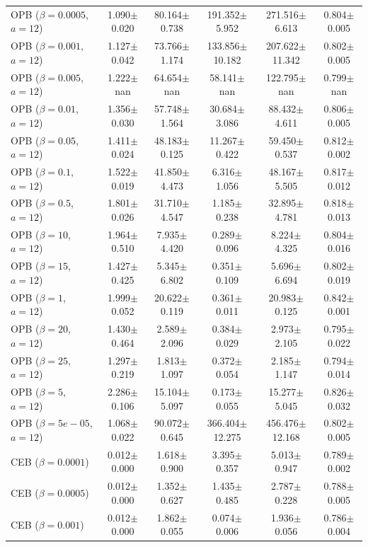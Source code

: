 \begin{table}[t]
{\begin{tabular}{l c c c c c}
OPB ($\beta=0.0005$, $a=12$) & 1.090$\pm$0.020 & 80.164$\pm$0.738 & 191.352$\pm$5.952 & 271.516$\pm$6.613 & 0.804$\pm$0.005 \\
OPB ($\beta=0.001$, $a=12$) & 1.127$\pm$0.042 & 73.766$\pm$1.174 & 133.856$\pm$10.182 & 207.622$\pm$11.342 & 0.802$\pm$0.005 \\
OPB ($\beta=0.005$, $a=12$) & 1.222$\pm$nan & 64.654$\pm$nan & 58.141$\pm$nan & 122.795$\pm$nan & 0.799$\pm$nan \\
OPB ($\beta=0.01$, $a=12$) & 1.356$\pm$0.030 & 57.748$\pm$1.564 & 30.684$\pm$3.086 & 88.432$\pm$4.611 & 0.806$\pm$0.005 \\
OPB ($\beta=0.05$, $a=12$) & 1.411$\pm$0.024 & 48.183$\pm$0.125 & 11.267$\pm$0.422 & 59.450$\pm$0.537 & 0.812$\pm$0.002 \\
OPB ($\beta=0.1$, $a=12$) & 1.522$\pm$0.019 & 41.850$\pm$4.473 & 6.316$\pm$1.056 & 48.167$\pm$5.505 & 0.817$\pm$0.012 \\
OPB ($\beta=0.5$, $a=12$) & 1.801$\pm$0.026 & 31.710$\pm$4.547 & 1.185$\pm$0.238 & 32.895$\pm$4.781 & 0.818$\pm$0.013 \\
OPB ($\beta=10$, $a=12$) & 1.964$\pm$0.510 & 7.935$\pm$4.420 & 0.289$\pm$0.096 & 8.224$\pm$4.325 & 0.804$\pm$0.016 \\
OPB ($\beta=15$, $a=12$) & 1.427$\pm$0.425 & 5.345$\pm$6.802 & 0.351$\pm$0.109 & 5.696$\pm$6.694 & 0.802$\pm$0.019 \\
OPB ($\beta=1$, $a=12$) & 1.999$\pm$0.052 & 20.622$\pm$0.119 & 0.361$\pm$0.011 & 20.983$\pm$0.125 & 0.842$\pm$0.001 \\
OPB ($\beta=20$, $a=12$) & 1.430$\pm$0.464 & 2.589$\pm$2.096 & 0.384$\pm$0.029 & 2.973$\pm$2.105 & 0.795$\pm$0.022 \\
OPB ($\beta=25$, $a=12$) & 1.297$\pm$0.219 & 1.813$\pm$1.097 & 0.372$\pm$0.054 & 2.185$\pm$1.147 & 0.794$\pm$0.014 \\
OPB ($\beta=5$, $a=12$) & 2.286$\pm$0.106 & 15.104$\pm$5.097 & 0.173$\pm$0.055 & 15.277$\pm$5.045 & 0.826$\pm$0.032 \\
OPB ($\beta=5e-05$, $a=12$) & 1.068$\pm$0.022 & 90.072$\pm$0.645 & 366.404$\pm$12.275 & 456.476$\pm$12.168 & 0.802$\pm$0.005 \\
\hline\hline
CEB ($\beta=0.0001$) & 0.012$\pm$0.000 & 1.618$\pm$0.900 & 3.395$\pm$0.357 & 5.013$\pm$0.947 & 0.789$\pm$0.002 \\
CEB ($\beta=0.0005$) & 0.012$\pm$0.000 & 1.352$\pm$0.627 & 1.435$\pm$0.485 & 2.787$\pm$0.228 & 0.788$\pm$0.005 \\
CEB ($\beta=0.001$) & 0.012$\pm$0.000 & 1.862$\pm$0.055 & 0.074$\pm$0.006 & 1.936$\pm$0.056 & 0.786$\pm$0.004 \\

\end{tabular}}
\end{table}
